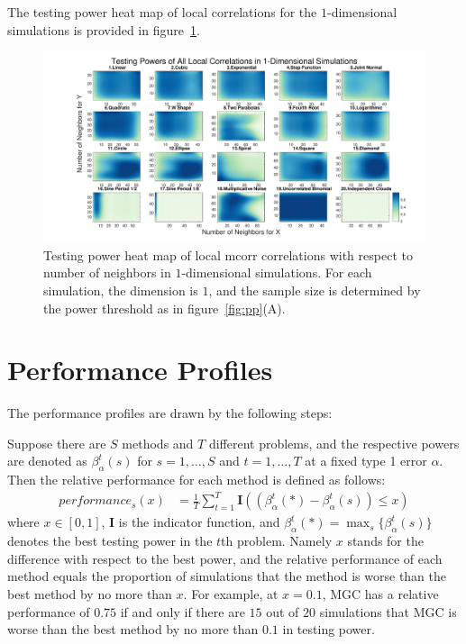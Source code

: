 \documentclass[11pt]{article}
\providecommand{\mb}[1]{\boldsymbol{#1}}
\begin{document}
The testing power heat map of local correlations for the $1$-dimensional simulations is provided in figure~\ref{figSim2}.
\begin{figure}[htbp]
\includegraphics[width=1.0\textwidth]{Figures/Fig2}
\caption{Testing power heat map of local mcorr correlations with respect to number of neighbors in $1$-dimensional simulations. For each simulation, the dimension is $1$, and the sample size is determined by the power threshold as in figure~\ref{fig:pp}(A).
}
\label{figSim2}
\end{figure}

\section{Performance Profiles}
\label{appen:profiles}
The performance profiles are drawn by the following steps:

Suppose there are $S$ methods and $T$ different problems, and the respective powers are denoted as $\beta_{\alpha}^{t}(s)$ for $s=1,\ldots,S$ and $t=1,\ldots,T$ at a fixed type 1 error $\alpha$. Then the relative performance for each method is defined as follows:
\begin{align*}
performance_{s}(x) &= \frac{1}{T} \sum_{t=1}^{T} \mb{I}((\beta_{\alpha}^{t}(*)-\beta_{\alpha}^{t}(s)) \leq x)
\end{align*}
where $x \in [0,1]$, $\mb{I}$ is the indicator function, and $\beta_{\alpha}^{t}(*) =\max_{s} \{\beta_{\alpha}^{t}(s)\}$ denotes the best testing power in the $t$th problem. Namely $x$ stands for the difference with respect to the best power, and the relative performance of each method equals the proportion of simulations that the method is worse than the best method by no more than $x$. For example, at $x=0.1$, MGC has a relative performance of $0.75$ if and only if there are $15$ out of $20$ simulations that MGC is worse than the best method by no more than $0.1$ in testing power. 
\end{document}
